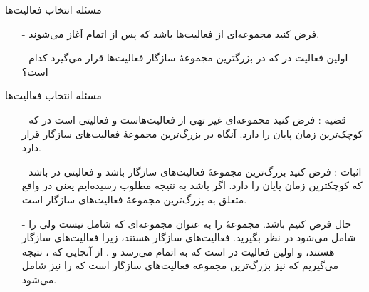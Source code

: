 \begin{frame}{‌مسئله انتخاب فعالیت‌ها}
\begin{itemize}\itemr
\item[-]
فرض کنید
مجموعه‌ای از فعالیت‌ها باشد که پس از اتمام
آغاز می‌شوند.
\item[-]
اولین فعالیت در 
که در بزرگترین مجموعهٔ سازگار فعالیت‌ها قرار می‌گیرد کدام است؟
\end{itemize}
\end{frame}

\begin{frame}{‌مسئله انتخاب فعالیت‌ها}
\begin{itemize}\itemr
\item[-]
قضیه : فرض کنید
مجموعه‌ای غیر تهی از فعالیت‌هاست و
فعالیتی است در
که کوچک‌ترین زمان پایان را دارد. آنگاه
در بزرگ‌ترین مجموعهٔ فعالیت‌های سازگار
قرار دارد.
\item[-]
اثبات : فرض کنید
بزرگ‌ترین مجموعهٔ فعالیت‌های سازگار
باشد و
فعالیتی در
باشد که کوچکترین زمان پایان را دارد. اگر
باشد به نتیجه مطلوب رسیده‌ایم یعنی در واقع
متعلق به بزرگ‌ترین مجموعهٔ فعالیت‌های سازگار
است.
\item[-]
حال فرض کنیم
باشد. مجموعهٔ
را به عنوان مجموعه‌ای که شامل
نیست ولی
را شامل می‌شود در نظر بگیرید. فعالیت‌های
سازگار هستند، زیرا فعالیت‌های
سازگار هستند،
و
اولین فعالیت در
است که به اتمام می‌رسد و
.
از آنجایی که
، نتیجه می‌گیریم که
نیز بزرگ‌ترین مجموعه فعالیت‌های سازگار
است که
را نیز شامل می‌شود.
\end{itemize}
\end{frame}



